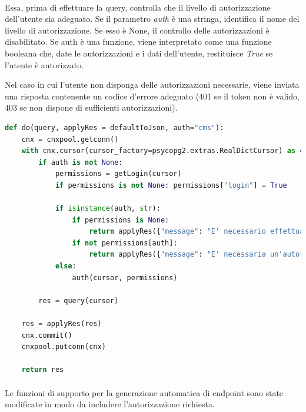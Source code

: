 \documentclass[12pt,a4paper,twoside,english,italian]{book}
\begin{document}
\paragraph{} Essa, prima di effettuare la query, controlla che il livello di autorizzazione dell'utente sia adeguato. Se il parametro \emph{auth} è una stringa, identifica il nome del livello di autorizzazione. Se esso è None, il controllo delle autorizzazioni è disabilitato. Se auth è una funzione, viene interpretato come una funzione booleana che, date le autorizzazioni e i dati dell'utente, restituisce \emph{True} se l'utente è autorizzato. 

\emph{} Nel caso in cui l'utente non disponga delle autorizzazioni necessarie, viene inviata una risposta contenente un codice d'errore adeguato (401 se il token non è valido, 403 se non dispone di sufficienti autorizzazioni).

\begin{lstlisting}[language=Python, caption=Funzione ausiliaria do modificata]
def do(query, applyRes = defaultToJson, auth="cms"):
    cnx = cnxpool.getconn()
    with cnx.cursor(cursor_factory=psycopg2.extras.RealDictCursor) as cursor:
        if auth is not None:
            permissions = getLogin(cursor)
            if permissions is not None: permissions["login"] = True

            if isinstance(auth, str):
                if permissions is None:
                    return applyRes({"message": "E' necessario effettuare il login"}, 401)
                if not permissions[auth]:
                    return applyRes({"message": "E' necessaria un'autorizzazione di tipo " + auth}, 403)
            else:
                auth(cursor, permissions)

        res = query(cursor)

    res = applyRes(res)
    cnx.commit()
    cnxpool.putconn(cnx)

    return res
\end{lstlisting}

\paragraph{} Le funzioni di supporto per la generazione automatica di endpoint sono state modificate in modo da includere l'autorizzazione richiesta. 
\end{document}
